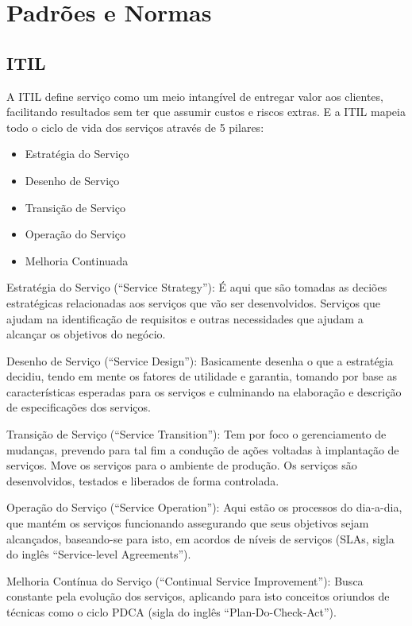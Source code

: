 \section{Padrões e Normas}
\subsection{ITIL}

A ITIL define serviço como um meio intangível de entregar valor aos clientes,
facilitando resultados sem ter que assumir custos e riscos extras. E a ITIL mapeia
todo o ciclo de vida dos serviços através de 5 pilares\cite{itsmfservice}:
\begin{itemize}[noitemsep]
  \item Estratégia do Serviço
  \item Desenho de Serviço
  \item Transição de Serviço
  \item Operação do Serviço
  \item Melhoria Continuada
\end{itemize}

Estratégia do Serviço (“Service Strategy”): É aqui que são tomadas as deciões
estratégicas relacionadas aos serviços que vão ser desenvolvidos. Serviços que
ajudam na identificação de requisitos e outras necessidades que ajudam a
alcançar os objetivos do negócio.

Desenho de Serviço (“Service Design”): Basicamente desenha o que a estratégia
decidiu, tendo em mente os fatores de utilidade e garantia, tomando por base
as características esperadas para os serviços e culminando na elaboração e
descrição de especificações dos serviços.

Transição de Serviço (“Service Transition”): Tem por foco o gerenciamento de
mudanças, prevendo para tal fim a condução de ações voltadas à implantação de
serviços. Move os serviços para o ambiente de produção. Os serviços são
desenvolvidos, testados e liberados de forma controlada.

Operação do Serviço (“Service Operation”): Aqui estão os processos do dia-a-dia,
 que mantém os serviços funcionando assegurando que seus objetivos sejam
 alcançados, baseando-se para isto, em acordos de níveis de serviços
 (SLAs, sigla do inglês “Service-level Agreements”).

Melhoria Contínua do Serviço (“Continual Service Improvement”): Busca
constante pela evolução dos serviços, aplicando para isto conceitos
oriundos de técnicas como o ciclo PDCA (sigla do inglês “Plan-Do-Check-Act”).

